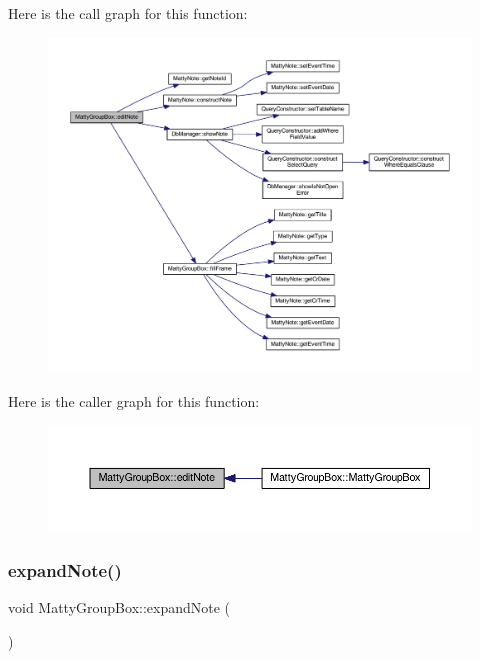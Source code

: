 Here is the call graph for this function\+:
\nopagebreak
\begin{figure}[H]
\begin{center}
\leavevmode
\includegraphics[width=350pt]{classMattyGroupBox_a446df41d130f1d6a411f35d80d62b055_cgraph}
\end{center}
\end{figure}
Here is the caller graph for this function\+:
\nopagebreak
\begin{figure}[H]
\begin{center}
\leavevmode
\includegraphics[width=350pt]{classMattyGroupBox_a446df41d130f1d6a411f35d80d62b055_icgraph}
\end{center}
\end{figure}
\hypertarget{classMattyGroupBox_a9797e81eba743d81cf8f45758921d8e7}{}\label{classMattyGroupBox_a9797e81eba743d81cf8f45758921d8e7} 
\subsubsection{\texorpdfstring{expand\+Note()}{expandNote()}}
{\footnotesize\ttfamily void Matty\+Group\+Box\+::expand\+Note (\begin{DoxyParamCaption}{ }\end{DoxyParamCaption})}



